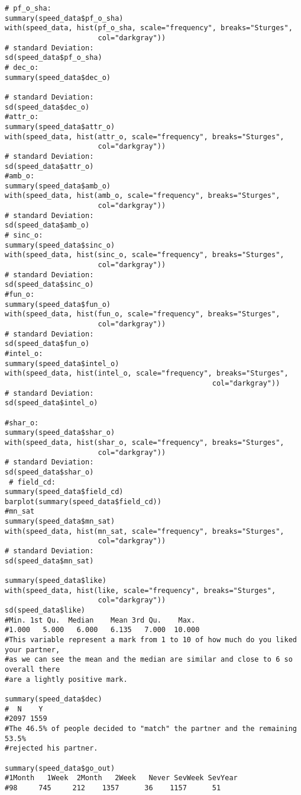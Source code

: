 \begin{verbatim}
# pf_o_sha:
summary(speed_data$pf_o_sha)
with(speed_data, hist(pf_o_sha, scale="frequency", breaks="Sturges", 
                      col="darkgray"))
# standard Deviation:
sd(speed_data$pf_o_sha)
# dec_o:
summary(speed_data$dec_o)

# standard Deviation:
sd(speed_data$dec_o)
#attr_o:
summary(speed_data$attr_o)
with(speed_data, hist(attr_o, scale="frequency", breaks="Sturges", 
                      col="darkgray"))
# standard Deviation:
sd(speed_data$attr_o)
#amb_o:
summary(speed_data$amb_o)
with(speed_data, hist(amb_o, scale="frequency", breaks="Sturges", 
                      col="darkgray"))
# standard Deviation:
sd(speed_data$amb_o)
# sinc_o:
summary(speed_data$sinc_o)
with(speed_data, hist(sinc_o, scale="frequency", breaks="Sturges", 
                      col="darkgray"))
# standard Deviation:
sd(speed_data$sinc_o)
#fun_o:
summary(speed_data$fun_o)
with(speed_data, hist(fun_o, scale="frequency", breaks="Sturges", 
                      col="darkgray"))
# standard Deviation:
sd(speed_data$fun_o)
#intel_o:
summary(speed_data$intel_o)
with(speed_data, hist(intel_o, scale="frequency", breaks="Sturges", 
                                                 col="darkgray"))
# standard Deviation:
sd(speed_data$intel_o)

#shar_o:
summary(speed_data$shar_o)
with(speed_data, hist(shar_o, scale="frequency", breaks="Sturges", 
                      col="darkgray"))
# standard Deviation:
sd(speed_data$shar_o)
 # field_cd:
summary(speed_data$field_cd)
barplot(summary(speed_data$field_cd))
#mn_sat
summary(speed_data$mn_sat)
with(speed_data, hist(mn_sat, scale="frequency", breaks="Sturges", 
                      col="darkgray"))
# standard Deviation:
sd(speed_data$mn_sat)

summary(speed_data$like)
with(speed_data, hist(like, scale="frequency", breaks="Sturges", 
                      col="darkgray"))
sd(speed_data$like)
#Min. 1st Qu.  Median    Mean 3rd Qu.    Max. 
#1.000   5.000   6.000   6.135   7.000  10.000 
#This variable represent a mark from 1 to 10 of how much do you liked your partner,
#as we can see the mean and the median are similar and close to 6 so overall there
#are a lightly positive mark.

summary(speed_data$dec)
#  N    Y 
#2097 1559
#The 46.5% of people decided to "match" the partner and the remaining 53.5%
#rejected his partner.

summary(speed_data$go_out)
#1Month   1Week  2Month   2Week   Never SevWeek SevYear 
#98     745     212    1357      36    1157      51 


\end{verbatim}
